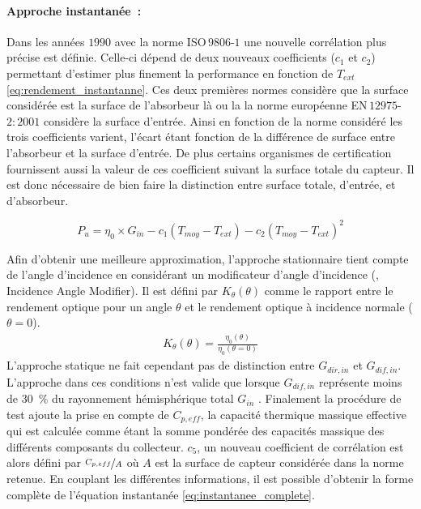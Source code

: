 \paragraph{Approche instantanée~:} %
\label{par:approche_instantanée}
Dans les années $1990$ avec la norme ISO\,$9806$-$1$ une nouvelle corrélation plus précise est définie. Celle-ci
dépend de deux nouveaux coefficients ($c_{1}$ et $c_{2}$) permettant d’estimer plus
finement la performance en fonction de $T_{ext}$ \eqref{eq:rendement_instantanne}.
Ces deux premières normes considère que la surface considérée est la surface de l’absorbeur là ou la
la norme européenne EN\,$12975$-$2:2001$  \parencite{EN1297522001} considère la surface d’entrée.
Ainsi en fonction de la norme considéré les trois coefficients varient, l’écart étant
fonction de la différence de surface entre l’absorbeur et la surface d’entrée.
De plus certains organismes de certification fournissent aussi la valeur de ces coefficient suivant la
surface totale du capteur. Il est donc nécessaire de bien faire la distinction entre
surface totale, d’entrée, et d’absorbeur.

\begin{equation}\label{eq:rendement_instantanne}
    P_{u} = \eta_{0} \times G_{in}- c_{1} (T_{moy} - T_{ext}) - c_{2} (T_{moy} - T_{ext})^{2}
\end{equation}

Afin d’obtenir une meilleure approximation, l’approche stationnaire tient compte
de l’angle d’incidence en considérant un modificateur d’angle d’incidence (, Incidence Angle Modifier).
Il est défini par $K_{\theta}(\theta)$ comme le rapport entre le rendement optique pour un angle $\theta$
et le rendement optique à incidence normale ($\theta = 0$).
\begin{equation}\label{eq:IAM}
    \begin{aligned}
    K_{\theta}(\theta) = \frac{\eta_{0}(\theta)}{\eta_{0}(\theta = 0)}
    \end{aligned}
\end{equation}
L’approche statique ne fait cependant pas de distinction entre $G_{dir, in}$ et $G_{dif, in}$.
L’approche dans ces conditions n’est valide que lorsque $G_{dif, in}$ représente moins de
\SI{30}{\percent} du rayonnement hémisphérique total $G_{in}$ \parencite{Osorio2014}.
Finalement la procédure de test ajoute la prise en compte de $C_{p, eff}$, la capacité thermique
massique effective qui est calculée comme étant la somme pondérée des capacités
massique des différents composants du collecteur. $c_{5}$, un nouveau coefficient de corrélation
est alors défini par $\nicefrac{C_{p, eff}}{A}$ où $A$ est la surface
de capteur considérée dans la norme retenue.
En couplant les différentes informations, il est possible d’obtenir la forme
complète de l’équation instantanée \eqref{eq:instantanee_complete}.

